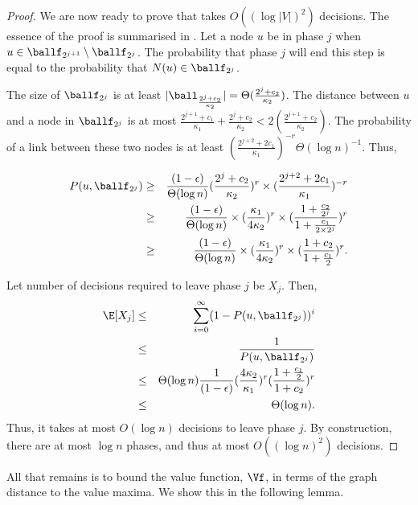 \begin{proof}
We are now ready to prove that \egreedyalgo takes $O( (\log |V|)^2 )$
decisions. The essence of the proof is summarised in
. Let a node $u$ be in phase $j$ when $u \in
\ballf_{2^{j+1}} \setminus \ballf_{2^{j}}$. The probability that phase
$j$ will end this step is equal to the probability that $N(u) \in
\ballf_{2^{j}}$. 

The size of $\ballf_{2^{j}}$ is at least $|\ball_{\frac{
2^{j}+c_2}{\kappa_2}}| = \Theta(\frac{2^{j}+c_2}{\kappa_2})$. The
distance between $u$ and a node in $\ballf_{2^{j}}$ is at most
$\frac{2^{j+1} + c_1}{ \kappa_1 } + \frac{2^{j} + c_2}{\kappa_2}
< 2(\frac{2^{j+1} + c_2}{\kappa_2})$. The probability of a link between
these two nodes is at least $(\frac{2^{j+2} + 2 c_1}{\kappa_1})^{-r}
\Theta(\log n)^{-1} $. Thus, 

\begin{eqnarray*}
    P(u, \ballf_{2^{j}} ) &\ge& \frac{(1-\epsilon)}{\Theta( \log n )} (\frac{2^{j}+c_2}{\kappa_2})^{r} \times (\frac{2^{j+2} + 2 c_1}{\kappa_1})^{-r} \\
    &\ge& \frac{(1-\epsilon)}{\Theta( \log n )} \times (\frac{\kappa_1}{4\kappa_2} )^{r} \times ( \frac{ 1 + \frac{c_2}{2^{j}} }{ 1 + \frac{c_1}{2 \times 2^{j}} })^{r}\\
    &\ge& \frac{(1-\epsilon)}{\Theta( \log n )} \times (\frac{\kappa_1}{4\kappa_2} )^{r} \times ( \frac{ 1 + c_2 }{ 1 + \frac{c_1}{2} })^{r} .\\
\end{eqnarray*}

Let number of decisions required to leave phase $j$ be $X_j$. Then, 
\begin{eqnarray*}
    \E[X_j] &\le& \sum_{i=0}^{\infty} (1 - P(u, \ballf_{2^{j}} ))^i \\
            &\le& \frac{1}{P(u, \ballf_{2^{j}} )} \\
            &\le& \Theta( \log n ) \frac{1}{(1-\epsilon)} (\frac{4 \kappa_2}{\kappa_1})^{r} ( \frac{ 1 + \frac{c_1}{2} }{ 1 + c_2 })^{r}\\
            &\le& \Theta( \log n ).
\end{eqnarray*}
Thus, it takes at most $O(\log n)$ decisions to leave phase $j$. By construction, there are at most $\log n$
phases, and thus at most $O((\log n)^2)$ decisions.
\end{proof}

All that remains is to bound the value function, $\Vf$, in terms of the
graph distance to the value maxima. We show this in the following lemma.

